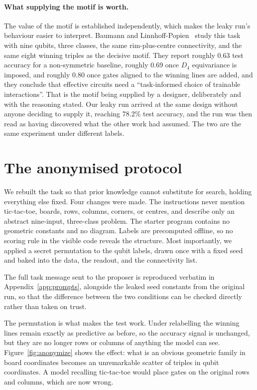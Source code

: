 \documentclass[11pt]{article}
\begin{document}
\paragraph{What supplying the motif is worth.}
The value of the motif is established independently, which makes the leaky run's
behaviour easier to interpret. Baumann and
Linnhoff-Popien~\cite{baumann2026} study this task with nine qubits, three
classes, the same rim-plus-centre connectivity, and the same eight winning triples
as the decisive motif. They report roughly 0.63 test accuracy for a
non-symmetric baseline, roughly 0.69 once $D_4$ equivariance is imposed, and
roughly 0.80 once gates aligned to the winning lines are added, and they conclude
that effective circuits need a ``task-informed choice of trainable
interactions''. That is the motif being supplied by a designer, deliberately and
with the reasoning stated. Our leaky run arrived at the same design without
anyone deciding to supply it, reaching 78.2\% test accuracy, and the run was then
read as having discovered what the other work had assumed. The two are the same
experiment under different labels.

\section{The anonymised protocol}
\label{sec:anon}

We rebuilt the task so that prior knowledge cannot substitute for search, holding
everything else fixed. Four changes were made. The instructions never mention
tic-tac-toe, boards, rows, columns, corners, or centres, and describe only an
abstract nine-input, three-class problem. The starter program contains no
geometric constants and no diagram. Labels are precomputed offline, so no
scoring rule in the visible code reveals the structure. Most importantly, we
applied a secret permutation to the qubit labels, drawn once with a fixed seed
and baked into the data, the readout, and the connectivity list.

The full task message sent to the proposer is reproduced verbatim in
Appendix~\ref{app:prompts}, alongside the leaked seed constants from the original
run, so that the difference between the two conditions can be checked directly
rather than taken on trust.

The permutation is what makes the test work. Under relabelling the winning lines
remain exactly as predictive as before, so the accuracy signal is unchanged, but
they are no longer rows or columns of anything the model can see.
Figure~\ref{fig:anonymize} shows the effect: what is an obvious geometric family
in board coordinates becomes an unremarkable scatter of triples in qubit
coordinates. A model recalling tic-tac-toe would place gates on the original
rows and columns, which are now wrong.
\end{document}
